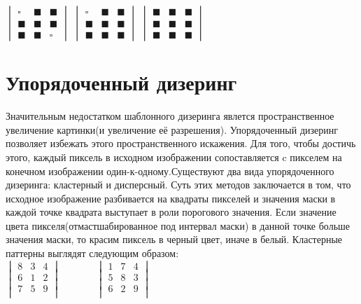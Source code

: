$\begin{vmatrix}
\square&\blacksquare&\blacksquare \\
\blacksquare &\blacksquare&\blacksquare \\
\blacksquare &\blacksquare&\square 
\end{vmatrix}$ 	 
$\begin{vmatrix}
\square&\blacksquare&\blacksquare \\
\blacksquare &\blacksquare&\blacksquare \\
\blacksquare &\blacksquare&\blacksquare 
\end{vmatrix}$ 
$\begin{vmatrix}
\blacksquare&\blacksquare&\blacksquare \\
\blacksquare &\blacksquare&\blacksquare \\
\blacksquare &\blacksquare&\blacksquare 
\end{vmatrix}$ 


\section{Упорядоченный дизеринг}
Значительным недостатком шаблонного дизеринга явлется пространственное увеличение картинки(и увеличение её разрешения). Упорядоченный дизеринг позволяет избежать этого пространственного искажения. Для того, чтобы достичь этого, каждый пиксель в исходном изображении   сопоставляется c пикселем на конечном изображении  один-к-одному.Существуют два вида упорядоченного дизеринга: кластерный и дисперсный.
Суть этих методов заключается в том, что  исходное изображение разбивается на квадраты пикселей и значения маски в каждой точке квадрата выступает в роли порогового значения. Если значение цвета пикселя(отмастшабированное под интервал маски) в данной точке больше значения маски, то красим пиксель в черный цвет, иначе в белый. Кластерные паттерны выглядят следующим образом:\\
$\begin{vmatrix}
8&  3 & 4  \\                      
6&  1&  2   \\                 
7 & 5 & 9  \\
\end{vmatrix}    $   ~    ~  ~  ~        
$\begin{vmatrix}
1 &  7 & 4 \\
5 & 8 & 3 \\
6 & 2 & 9 \\
\end{vmatrix}$

